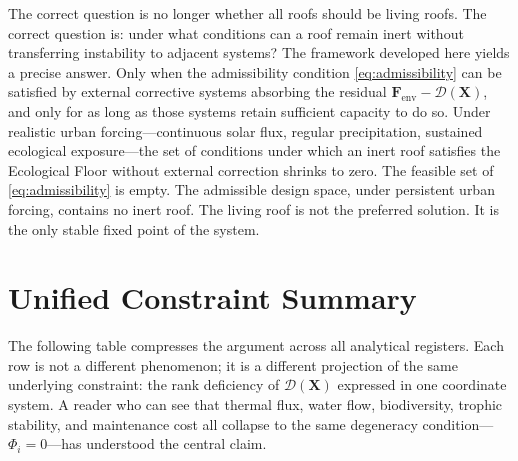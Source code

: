 \documentclass[12pt, a4paper]{article}
\theoremstyle{plain}
\theoremstyle{remark}
\begin{document}
The correct question is no longer whether all roofs should be living roofs. The correct question is: under what conditions can a roof remain inert without transferring instability to adjacent systems? The framework developed here yields a precise answer. Only when the admissibility condition \eqref{eq:admissibility} can be satisfied by external corrective systems absorbing the residual $\mathbf{F}_{\text{env}} - \mathcal{D}(\mathbf{X})$, and only for as long as those systems retain sufficient capacity to do so. Under realistic urban forcing---continuous solar flux, regular precipitation, sustained ecological exposure---the set of conditions under which an inert roof satisfies the Ecological Floor without external correction shrinks to zero. The feasible set of \eqref{eq:admissibility} is empty. The admissible design space, under persistent urban forcing, contains no inert roof. The living roof is not the preferred solution. It is the only stable fixed point of the system.

\appendix
\section{Unified Constraint Summary}

The following table compresses the argument across all analytical registers. Each row is not a different phenomenon; it is a different projection of the same underlying constraint: the rank deficiency of $\mathcal{D}(\mathbf{X})$ expressed in one coordinate system. A reader who can see that thermal flux, water flow, biodiversity, trophic stability, and maintenance cost all collapse to the same degeneracy condition---$\Phi_i = 0$---has understood the central claim.
\end{document}
